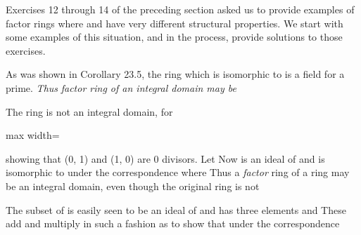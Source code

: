 \documentclass[11pt,oneside]{article}
\begin{document}
\fi
\renewcommand{\BookFooter}{Section 31 Prime and Maximal Ideals}
\ifdefined\BookMaster\else\setcounter{page}{250}\fi
\BookNarrativetrue

\begin{BookBody}


\noindent Exercises 12 through 14 of the preceding section asked us to provide examples of factor rings  where  and  have very different structural properties. We start with some examples of this situation, and in the process, provide solutions to those exercises.

 As was shown in Corollary 23.5, the ring  which is isomorphic to  is a field for  a prime.\textit{ Thus}  \textit{factor ring of an integral domain may be} \BookEnd{\blacktriangle}

 The ring  is not an integral domain, for

\begin{center}\begin{adjustbox}{max width=\linewidth}\end{adjustbox}\end{center}

\noindent showing that (0, 1) and (1, 0) are 0 divisors. Let  Now  is an ideal of  and  is isomorphic to  under the correspondence \BookInline{[(m,\allowbreak 0)+ N]\leftrightarrow }  where  Thus a\textit{ factor} ring of a ring may be an integral domain, even though the original ring is not\BookEnd{\blacktriangle}

 The subset  of  is easily seen to be an ideal of  and  has three elements and  These add and multiply in such a fashion as to show that  under the correspondence


\end{BookBody}
\end{document}
